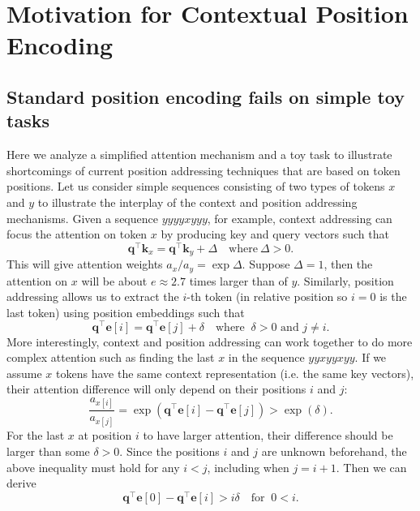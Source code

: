 \documentclass{article}
\renewcommand{\vec}{\mathbf}
\begin{document}
\section{Motivation for Contextual Position Encoding}

\subsection{Standard position encoding fails on simple toy tasks}
\label{sec:toy_fail}
Here we analyze a simplified attention mechanism and a toy task to illustrate shortcomings of current position addressing techniques that are based on token positions.
Let us consider simple sequences consisting of two types of tokens $x$ and $y$ to illustrate the interplay of the context and position addressing mechanisms.
Given a sequence $yyyyxyyy$, for example,  context addressing can focus the attention on token $x$ by producing key and query vectors such that 
\begin{equation}\label{eq:delta}  
\vec{q}^\top \vec{k}_x = \vec{q}^\top \vec{k}_y + \Delta \quad \text{where} \ \Delta > 0 .
\end{equation}
This will give attention weights $a_x / a_y = \exp{\Delta}$.
Suppose $\Delta=1$, then the attention on $x$ will be about $e\approx 2.7$ times larger than of $y$.
Similarly, position addressing allows us to extract the $i$-th token (in relative position so $i=0$ is the last token)
using position embeddings such that
\[
\vec{q}^\top \vec{e}[i] = \vec{q}^\top \vec{e}[j] + \delta \quad \text{where } \ \delta > 0 \text{ and } j \neq i .
\]
More interestingly, context and position addressing can work together to do more complex attention such as finding the last $x$ in the sequence $yyxyyxyy$. 
If we assume $x$ tokens have the same context representation (i.e. the same key vectors), their attention difference will only depend on their positions $i$ and $j$:
\[
\frac{a_{x[i]}}{a_{x[j]}} = \exp{(\vec{q}^\top \vec{e}[i] - \vec{q}^\top \vec{e}[j])} > \exp(\delta).
\]
For the last $x$ at position $i$ to have larger attention, their difference should be larger than some $\delta > 0$.
Since the positions $i$ and $j$ are unknown beforehand, the above inequality must hold for any $i<j$, including when $j=i+1$.
Then we can derive
\[
\vec{q}^\top \vec{e}[0]  - \vec{q}^\top \vec{e}[i]  > i \delta  \quad \text{for } \ 0 < i .
\]
\end{document}
